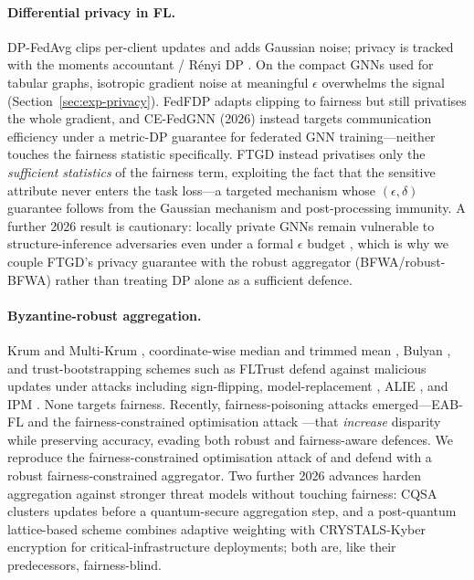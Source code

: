 \documentclass[pdflatex,sn-mathphys-num]{sn-jnl}
\theoremstyle{thmstyleone}%
\theoremstyle{thmstyletwo}%
\theoremstyle{thmstylethree}%
\begin{document}
\paragraph{Differential privacy in FL.}
DP-FedAvg \cite{mcmahan2018learning} clips per-client updates and adds Gaussian
noise; privacy is tracked with the moments accountant / R\'enyi DP
\cite{mironov2017renyi,abadi2016deep}. On the compact GNNs used for tabular
graphs, isotropic gradient noise at meaningful $\epsilon$ overwhelms the signal
(Section~\ref{sec:exp-privacy}). FedFDP \cite{ling2024feddp} adapts clipping to
fairness but still privatises the whole gradient, and CE-FedGNN
\cite{guo2026cefedgnn} (2026) instead targets communication efficiency under a
metric-DP guarantee for federated GNN training---neither touches the fairness
statistic specifically. FTGD instead privatises only the \emph{sufficient
statistics} of the fairness term, exploiting the fact that the sensitive
attribute never enters the task loss---a targeted mechanism whose
$(\epsilon,\delta)$ guarantee follows from the Gaussian mechanism and
post-processing immunity. A further 2026 result is cautionary: locally private
GNNs remain vulnerable to structure-inference adversaries even under a
formal $\epsilon$ budget \cite{varun2026adversarial}, which is why we couple
FTGD's privacy guarantee with the robust aggregator (BFWA/robust-BFWA) rather
than treating DP alone as a sufficient defence.

\paragraph{Byzantine-robust aggregation.}
Krum and Multi-Krum \cite{blanchard2017krum}, coordinate-wise median and
trimmed mean \cite{yin2018byzantine}, Bulyan \cite{mhamdi2018hidden}, and
trust-bootstrapping schemes such as FLTrust \cite{cao2021fltrust} defend
against malicious updates under attacks including sign-flipping,
model-replacement \cite{bagdasaryan2020backdoor}, ALIE \cite{baruch2019little},
and IPM \cite{xie2019fall}. None targets fairness. Recently, fairness-poisoning
attacks emerged---EAB-FL \cite{eabfl2024} and the fairness-constrained
optimisation attack \cite{kasyap2025attack}---that \emph{increase} disparity
while preserving accuracy, evading both robust and fairness-aware defences. We
reproduce the fairness-constrained optimisation attack of
\cite{kasyap2025attack} and defend with a robust fairness-constrained
aggregator. Two further 2026 advances harden aggregation against stronger
threat models without touching fairness: CQSA \cite{nath2026cqsa} clusters
updates before a quantum-secure aggregation step, and a post-quantum
lattice-based scheme \cite{rahmati2026pqbyzantine} combines adaptive weighting
with CRYSTALS-Kyber encryption for critical-infrastructure deployments; both
are, like their predecessors, fairness-blind.
\end{document}
